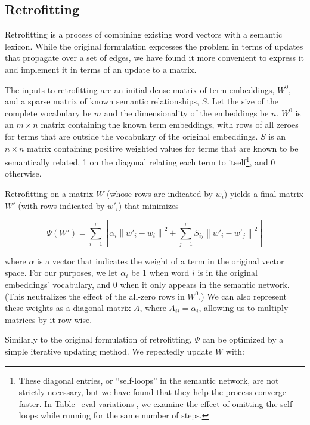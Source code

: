 \documentclass[11pt,letterpaper]{article}
\begin{document}
\subsection{Retrofitting}


Retrofitting \cite{faruqui2015retrofitting} is a process of combining existing
word vectors with a semantic lexicon. While the original formulation expresses
the problem in terms of updates that propagate over a set of edges, we have
found it more convenient to express it and implement it in terms of an update
to a matrix.

The inputs to retrofitting are an initial dense matrix of term embeddings,
$W^0$, and a sparse matrix of known semantic relationships, $S$. Let the size
of the complete vocabulary be $m$ and the dimensionality of the embeddings be $n$.
$W^0$ is an $m \times n$ matrix containing the known term embeddings, with
rows of all zeroes for terms that are outside the vocabulary of the original embeddings.
$S$ is an $n \times n$ matrix containing positive weighted values for terms that
are known to be semantically related, 1 on the diagonal relating each term to
itself\footnote{
    These diagonal entries, or ``self-loops'' in the semantic network, are not strictly
    necessary, but we have found that they help the process converge faster.
    In Table~\ref{eval-variations}, we examine the effect of omitting the self-loops
    while running for the same number of steps.
}, and 0 otherwise.

Retrofitting on a matrix $W$ (whose rows are indicated by $w_i$) yields a final
matrix $W'$ (with rows indicated by $w'_i$) that minimizes

\begin{small}
$$
\Psi \left( W' \right) = \sum_{i=1}^v \left[
  \alpha_i \left\|  w'_i - w_i \right\| ^ 2
  + \sum_{j=1}^v S_{ij} \left\| w'_i - w'_j \right\| ^ 2
\right]
$$
\end{small}

where $\alpha$ is a vector that indicates the weight of a term in the original
vector space. For our purposes, we let $\alpha_i$ be 1 when word $i$ is in the
original embeddings' vocabulary, and 0 when it only appears in the semantic
network. (This neutralizes the effect of the all-zero rows in $W^0$.) We can
also represent these weights as a diagonal matrix $A$, where $A_{ii} =
\alpha_i$, allowing us to multiply matrices by it row-wise.

Similarly to the original formulation of retrofitting, $\Psi$ can be optimized
by a simple iterative updating method. We repeatedly update $W$ with:
\end{document}
